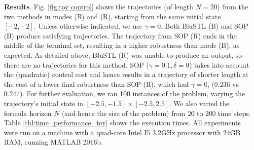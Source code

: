 \begin{exmp}
\textbf{Results}.
Fig. \ref{fig:toy control} shows the trajectories (of length $N=20$) from the two methods in modes (B) and (R), starting from the same initial state $[-2,-2]$. Unless otherwise indicated, we use $\gamma=0$. Both BluSTL (B) and SOP (B) produce satisfying trajectories. The trajectory from SOP (R) ends in the middle of the terminal set, resulting in a higher robustness than mode (B), as expected. As detailed above, BluSTL (R) was unable to produce an output, so there are no trajectories for this method. SOP ($\gamma=0.1,\delta=0$) takes into account the (quadratic) control cost and hence results in a trajectory of shorter length at the cost of a lower final robustness than SOP (R), which had $\gamma = 0$, ($0.236$ vs $0.247$).
For further evaluation, we ran 100 instances of the problem, varying the trajectory's initial state in $[-2.5,-1.5] \times [-2.5,2.5]$. We also varied the formula horizon $N$ (and hence the size of the problem) from $20$ to $200$ time steps. 
Table \ref{tbl:time_performance_toy} shows the execution times. All experiments were run on a machine with a quad-core Intel I5 3.2GHz processor with 24GB RAM, running MATLAB 2016b.




\end{exmp}
